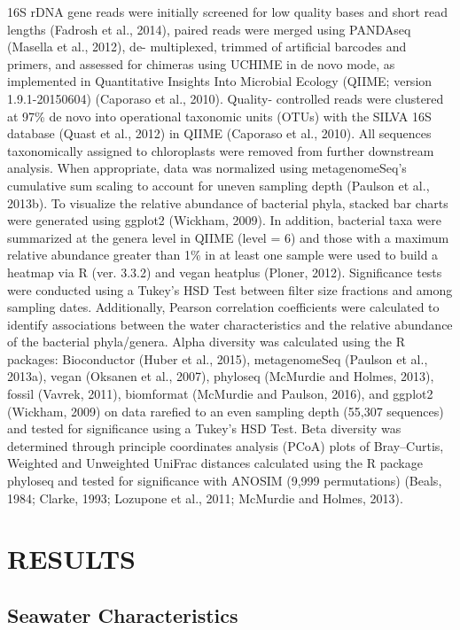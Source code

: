 \documentclass[a4,center,fleqn]{NAR}
\begin{document}
16S rDNA gene reads were initially screened for low quality bases and short read lengths (Fadrosh et al., 2014), paired reads were merged using PANDAseq (Masella et al., 2012), de- multiplexed, trimmed of artificial barcodes and primers, and assessed for chimeras using UCHIME in de novo mode, as implemented in Quantitative Insights Into Microbial Ecology (QIIME; version 1.9.1-20150604) (Caporaso et al., 2010). Quality- controlled reads were clustered at 97\% de novo into operational taxonomic units (OTUs) with the SILVA 16S database (Quast et al., 2012) in QIIME (Caporaso et al., 2010). All sequences taxonomically assigned to chloroplasts were removed from further downstream analysis. When appropriate, data was normalized using metagenomeSeq’s cumulative sum scaling to account for uneven sampling depth (Paulson et al., 2013b).
To visualize the relative abundance of bacterial phyla, stacked bar charts were generated using ggplot2 (Wickham, 2009). In addition, bacterial taxa were summarized at the genera level in QIIME (level = 6) and those with a maximum relative abundance greater than 1\% in at least one sample were used to build a heatmap via R (ver. 3.3.2) and vegan heatplus (Ploner, 2012).
Significance tests were conducted using a Tukey’s HSD Test between filter size fractions and among sampling dates. Additionally, Pearson correlation coefficients were calculated to identify associations between the water characteristics and the relative abundance of the bacterial phyla/genera.
Alpha diversity was calculated using the R packages: Bioconductor (Huber et al., 2015), metagenomeSeq (Paulson et al., 2013a), vegan (Oksanen et al., 2007), phyloseq (McMurdie and Holmes, 2013), fossil (Vavrek, 2011), biomformat (McMurdie and Paulson, 2016), and ggplot2 (Wickham, 2009) on data rarefied to an even sampling depth (55,307 sequences) and tested for significance using a Tukey’s HSD Test.
Beta diversity was determined through principle coordinates analysis (PCoA) plots of Bray–Curtis, Weighted and Unweighted UniFrac distances calculated using the R package phyloseq and tested for significance with ANOSIM (9,999 permutations) (Beals, 1984; Clarke, 1993; Lozupone et al., 2011; McMurdie and Holmes, 2013).

\section{RESULTS}

\subsection{Seawater Characteristics}
\end{document}
